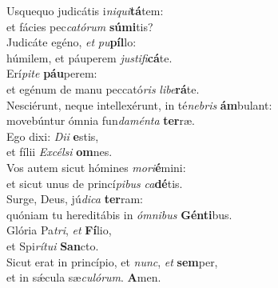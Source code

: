 \evenverse Usquequo judicátis i\textit{ni}\textit{qui}\textbf{tá}tem:~\*\\
\evenverse et fácies pec\textit{ca}\textit{tó}\textit{rum} \textbf{sú}\textbf{mi}tis?\\
\oddverse Judicáte egéno, \textit{et} \textit{pu}\textbf{píl}lo:~\*\\
\oddverse húmilem, et páuperem \textit{ju}\textit{sti}\textit{fi}\textbf{cá}te.\\
\evenverse Erí\textit{pi}\textit{te} \textbf{páu}perem:~\*\\
\evenverse et egénum de manu peccató\textit{ris} \textit{li}\textit{be}\textbf{rá}te.\\
\oddverse Nesciérunt, neque intellexérunt, in té\textit{ne}\textit{bris} \textbf{ám}bulant:~\*\\
\oddverse movebúntur ómnia fun\textit{da}\textit{mén}\textit{ta} \textbf{ter}ræ.\\
\evenverse Ego dixi: \textit{Di}\textit{i} \textbf{e}stis,~\*\\
\evenverse et fílii \textit{Ex}\textit{cél}\textit{si} \textbf{om}nes.\\
\oddverse Vos autem sicut hómines \textit{mo}\textit{ri}\textbf{é}mini:~\*\\
\oddverse et sicut unus de princí\textit{pi}\textit{bus} \textit{ca}\textbf{dé}tis.\\
\evenverse Surge, Deus, jú\textit{di}\textit{ca} \textbf{ter}ram:~\*\\
\evenverse quóniam tu hereditábis in \textit{óm}\textit{ni}\textit{bus} \textbf{Gén}\textbf{ti}bus.\\
\oddverse Glória Pa\textit{tri}, \textit{et} \textbf{Fí}lio,~\*\\
\oddverse et Spi\textit{rí}\textit{tu}\textit{i} \textbf{San}cto.\\
\evenverse Sicut erat in princípio, et \textit{nunc}, \textit{et} \textbf{sem}per,~\*\\
\evenverse et in sǽcula sæ\textit{cu}\textit{ló}\textit{rum}. \textbf{A}men.\\
